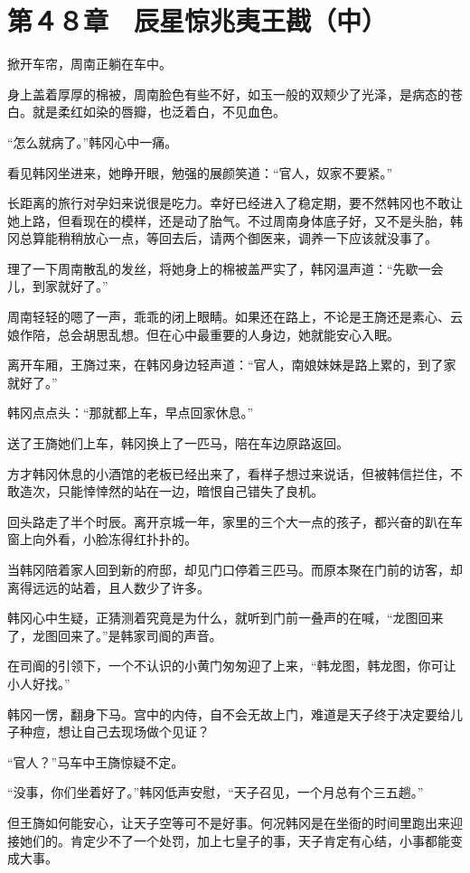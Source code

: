 \section{第４８章　辰星惊兆夷王戡（中）}

掀开车帘，周南正躺在车中。

身上盖着厚厚的棉被，周南脸色有些不好，如玉一般的双颊少了光泽，是病态的苍白。就是柔红如染的唇瓣，也泛着白，不见血色。

“怎么就病了。”韩冈心中一痛。

看见韩冈坐进来，她睁开眼，勉强的展颜笑道：“官人，奴家不要紧。”

长距离的旅行对孕妇来说很是吃力。幸好已经进入了稳定期，要不然韩冈也不敢让她上路，但看现在的模样，还是动了胎气。不过周南身体底子好，又不是头胎，韩冈总算能稍稍放心一点，等回去后，请两个御医来，调养一下应该就没事了。

理了一下周南散乱的发丝，将她身上的棉被盖严实了，韩冈温声道：“先歇一会儿，到家就好了。”

周南轻轻的嗯了一声，乖乖的闭上眼睛。如果还在路上，不论是王旖还是素心、云娘作陪，总会胡思乱想。但在心中最重要的人身边，她就能安心入眠。

离开车厢，王旖过来，在韩冈身边轻声道：“官人，南娘妹妹是路上累的，到了家就好了。”

韩冈点点头：“那就都上车，早点回家休息。”

送了王旖她们上车，韩冈换上了一匹马，陪在车边原路返回。

方才韩冈休息的小酒馆的老板已经出来了，看样子想过来说话，但被韩信拦住，不敢造次，只能悻悻然的站在一边，暗恨自己错失了良机。

回头路走了半个时辰。离开京城一年，家里的三个大一点的孩子，都兴奋的趴在车窗上向外看，小脸冻得红扑扑的。

当韩冈陪着家人回到新的府邸，却见门口停着三匹马。而原本聚在门前的访客，却离得远远的站着，且人数少了许多。

韩冈心中生疑，正猜测着究竟是为什么，就听到门前一叠声的在喊，“龙图回来了，龙图回来了。”是韩家司阍的声音。

在司阍的引领下，一个不认识的小黄门匆匆迎了上来，“韩龙图，韩龙图，你可让小人好找。”

韩冈一愣，翻身下马。宫中的内侍，自不会无故上门，难道是天子终于决定要给儿子种痘，想让自己去现场做个见证？

“官人？”马车中王旖惊疑不定。

“没事，你们坐着好了。”韩冈低声安慰，“天子召见，一个月总有个三五趟。”

但王旖如何能安心，让天子空等可不是好事。何况韩冈是在坐衙的时间里跑出来迎接她们的。肯定少不了一个处罚，加上七皇子的事，天子肯定有心结，小事都能变成大事。

